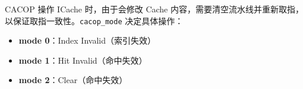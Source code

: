 CACOP 操作 ICache 时，由于会修改 Cache 内容，需要清空流水线并重新取指，以保证取指一致性。\verb|cacop_mode| 决定具体操作：
\begin{itemize}
    \item \textbf{mode 0}：Index Invalid（索引失效）
    \item \textbf{mode 1}：Hit Invalid（命中失效）
    \item \textbf{mode 2}：Clear（命中失效）
\end{itemize}
